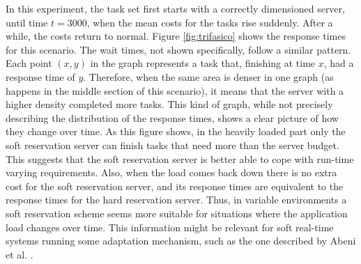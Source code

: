 \documentclass[times, 10pt,twocolumn]{article}
\begin{document}
In this experiment, the task set first starts with a correctly
dimensioned server, until time $t=3000$, when the mean costs for the
tasks rise suddenly. After a while, the costs return to normal. Figure
\ref{fig:trifasico} shows the response times for this scenario. The
wait times, not shown specifically, follow a similar pattern. Each
point $(x,y)$ in the graph represents a task that, finishing at time
$x$, had a response time of $y$. Therefore, when the same area is
denser in one graph (as happens in the middle section of this
scenario), it means that the server with a higher density completed
more tasks. This kind of graph, while not precisely describing the
distribution of the response times, shows a clear picture of how they
change over time. As this figure shows, in the heavily loaded part
only the soft reservation server can finish tasks that need more than
the server budget. This suggests that the soft reservation server is
better able to cope with run-time varying requirements. Also, when the
load comes back down there is no extra cost for the soft reservation
server, and its response times are equivalent to the response times
for the hard reservation server. Thus, in variable environments a soft
reservation scheme seems more suitable for situations where the
application load changes over time. This information might be relevant
for soft real-time systems running some adaptation mechanism, such as
the one described by Abeni et al. \cite{abeni.ea05:qos}.
\end{document}
